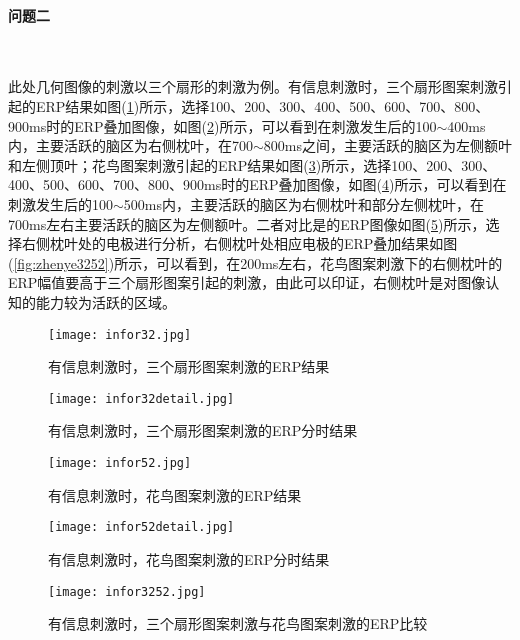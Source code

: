 \documentclass{hitreport}
\begin{document}
\paragraph{问题二}~{}

此处几何图像的刺激以三个扇形的刺激为例。有信息刺激时，三个扇形图案刺激引起的ERP结果如图(\ref{fig:infor32})所示，选择100、200、300、400、500、600、700、800、900ms时的ERP叠加图像，如图(\ref{fig:infor32detail})所示，可以看到在刺激发生后的100$\sim$400ms内，主要活跃的脑区为右侧枕叶，在700$\sim$800ms之间，主要活跃的脑区为左侧额叶和左侧顶叶；花鸟图案刺激引起的ERP结果如图(\ref{fig:infor52})所示，选择100、200、300、400、500、600、700、800、900ms时的ERP叠加图像，如图(\ref{fig:infor52detail})所示，可以看到在刺激发生后的100$\sim$500ms内，主要活跃的脑区为右侧枕叶和部分左侧枕叶，在700ms左右主要活跃的脑区为左侧额叶。二者对比是的ERP图像如图(\ref{fig:infor3252})所示，选择右侧枕叶处的电极进行分析，右侧枕叶处相应电极的ERP叠加结果如图(\ref{fig:zhenye3252})所示，可以看到，在200ms左右，花鸟图案刺激下的右侧枕叶的ERP幅值要高于三个扇形图案引起的刺激，由此可以印证，右侧枕叶是对图像认知的能力较为活跃的区域。

\begin{figure}[htb]
\centering
\texttt{[image: infor32.jpg]}
\caption{有信息刺激时，三个扇形图案刺激的ERP结果}\label{fig:infor32}
\end{figure}

\begin{figure}[htb]
\centering\texttt{[image: infor32detail.jpg]}
\caption{有信息刺激时，三个扇形图案刺激的ERP分时结果}\label{fig:infor32detail}
\end{figure}

\begin{figure}[htb]
\centering
\texttt{[image: infor52.jpg]}
\caption{有信息刺激时，花鸟图案刺激的ERP结果}\label{fig:infor52}
\end{figure}

\begin{figure}[htb]
\centering
\texttt{[image: infor52detail.jpg]}
\caption{有信息刺激时，花鸟图案刺激的ERP分时结果}\label{fig:infor52detail}
\end{figure}

\begin{figure}[htb]
\centering
\texttt{[image: infor3252.jpg]}
\caption{有信息刺激时，三个扇形图案刺激与花鸟图案刺激的ERP比较}\label{fig:infor3252}
\end{figure}
\end{document}
